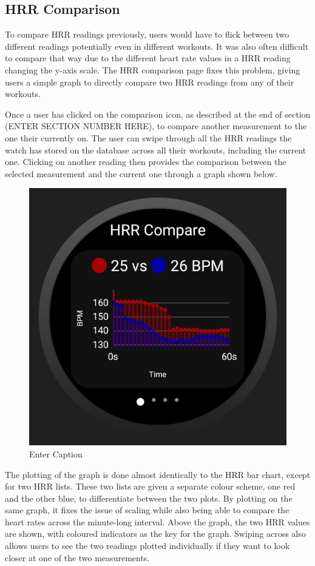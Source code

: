 \documentclass{l4proj}
\begin{document}
\subsection{HRR Comparison}

To compare HRR readings previously, users would have to flick between two different readings potentially even in different workouts. It was also often difficult to compare that way due to the different heart rate values in a HRR reading changing the y-axis scale. The HRR comparison page fixes this problem, giving users a simple graph to directly compare two HRR readings from any of their workouts.

Once a user has clicked on the comparison icon, as described at the end of section (ENTER SECTION NUMBER HERE), to compare another measurement to the one their currently on. The user can swipe through all the HRR readings the watch has stored on the database across all their workouts, including the current one. Clicking on another reading then provides the comparison between the selected measurement and the current one through a graph shown below.

\begin{figure}[h!]
    \centering
    \includegraphics[width=0.5\linewidth]{dissertation//dissImages/HRRCompareGraph.png}
    \caption{Enter Caption}
    \label{fig:enter-label}
\end{figure}

The plotting of the graph is done almost identically to the HRR bar chart, except for two HRR lists. These two lists are given a separate colour scheme, one red and the other blue, to differentiate between the two plots. By plotting on the same graph, it fixes the issue of scaling while also being able to compare the heart rates across the minute-long interval. Above the graph, the two HRR values are shown, with coloured indicators as the key for the graph. Swiping across also allows users to see the two readings plotted individually if they want to look closer at one of the two measurements.
\end{document}
